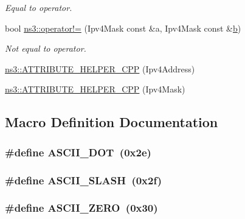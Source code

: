 \begin{DoxyCompactItemize}
\begin{DoxyCompactList}\small\item\em Equal to operator. \end{DoxyCompactList}\item 
bool \hyperlink{namespacens3_a378c3f13d818eb2145963850b481b8c9}{ns3\+::operator!=} (Ipv4\+Mask const \&a, Ipv4\+Mask const \&\hyperlink{lte__pathloss_8m_a21ad0bd836b90d08f4cf640b4c298e7c}{b})
\begin{DoxyCompactList}\small\item\em Not equal to operator. \end{DoxyCompactList}\item 
\hyperlink{namespacens3_a87b761d5f5029e65a098560164888fa2}{ns3\+::\+A\+T\+T\+R\+I\+B\+U\+T\+E\+\_\+\+H\+E\+L\+P\+E\+R\+\_\+\+C\+PP} (Ipv4\+Address)
\item 
\hyperlink{namespacens3_a1721ffad93e77009aef3d6faf0a1def5}{ns3\+::\+A\+T\+T\+R\+I\+B\+U\+T\+E\+\_\+\+H\+E\+L\+P\+E\+R\+\_\+\+C\+PP} (Ipv4\+Mask)
\end{DoxyCompactItemize}


\subsection{Macro Definition Documentation}
\subsubsection[{\texorpdfstring{A\+S\+C\+I\+I\+\_\+\+D\+OT}{ASCII_DOT}}]{\setlength{\rightskip}{0pt plus 5cm}\#define A\+S\+C\+I\+I\+\_\+\+D\+OT~(0x2e)}\hypertarget{ipv4-address_8cc_a6ec0f0cb1e0c4e317469e4103bec5fd5}{}\label{ipv4-address_8cc_a6ec0f0cb1e0c4e317469e4103bec5fd5}
\subsubsection[{\texorpdfstring{A\+S\+C\+I\+I\+\_\+\+S\+L\+A\+SH}{ASCII_SLASH}}]{\setlength{\rightskip}{0pt plus 5cm}\#define A\+S\+C\+I\+I\+\_\+\+S\+L\+A\+SH~(0x2f)}\hypertarget{ipv4-address_8cc_a05ce5056eb6f531e16086c4b2c186183}{}\label{ipv4-address_8cc_a05ce5056eb6f531e16086c4b2c186183}
\subsubsection[{\texorpdfstring{A\+S\+C\+I\+I\+\_\+\+Z\+E\+RO}{ASCII_ZERO}}]{\setlength{\rightskip}{0pt plus 5cm}\#define A\+S\+C\+I\+I\+\_\+\+Z\+E\+RO~(0x30)}\hypertarget{ipv4-address_8cc_abde11a6ee98560227d0d3889da0408e4}{}\label{ipv4-address_8cc_abde11a6ee98560227d0d3889da0408e4}

